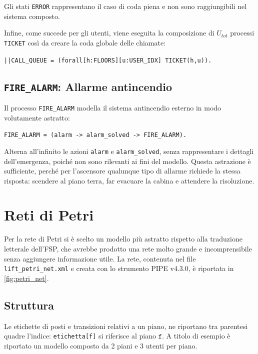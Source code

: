 Gli stati \texttt{ERROR} rappresentano il caso di coda piena e non sono raggiungibili nel sistema composto.

Infine, come succede per gli utenti, viene eseguita la composizione di $U_{tot}$ processi \texttt{TICKET} così da creare la coda globale delle chiamate:
\begin{center}
  \texttt{||CALL\_QUEUE = (forall[h:FLOORS][u:USER\_IDX] TICKET(h,u)).}
\end{center}

\subsection{\texttt{FIRE\_ALARM}: Allarme antincendio}
Il processo \texttt{FIRE\_ALARM} modella il sistema antincendio esterno in modo volutamente astratto:
\begin{center}
  \texttt{FIRE\_ALARM = (alarm -> alarm\_solved -> FIRE\_ALARM).}
\end{center}

Alterna all'infinito le azioni \texttt{alarm} e \texttt{alarm\_solved}, senza rappresentare i dettagli dell'emergenza, poiché non sono rilevanti ai fini del modello.
Questa astrazione è sufficiente, perché per l'ascensore qualunque tipo di allarme richiede la stessa risposta: scendere al piano terra, far evacuare la cabina e attendere la risoluzione.

%
%
\section{Reti di Petri}
Per la rete di Petri si è scelto un modello più astratto rispetto alla traduzione letterale dell'FSP, che avrebbe prodotto una rete molto grande e incomprensibile senza aggiungere informazione utile.
La rete, contenuta nel file \texttt{lift\_petri\_net.xml} e creata con lo strumento PIPE v4.3.0, è riportata in \cref{fig:petri_net}.

\subsection{Struttura}
Le etichette di posti e transizioni relativi a un piano, ne riportano tra parentesi quadre l'indice: \texttt{etichetta[f]} si riferisce al piano $\texttt{f}$.
A titolo di esempio è riportato un modello composto da 2 piani e 3 utenti per piano.

